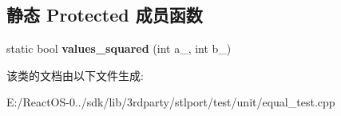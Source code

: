 \subsection*{静态 Protected 成员函数}
\begin{DoxyCompactItemize}
\item 
\mbox{\label{class_equal_test_a5cbc4fa89d5a732d8feca3b4582776fc}} 
static bool {\bfseries values\+\_\+squared} (int a\+\_\+, int b\+\_\+)
\end{DoxyCompactItemize}


该类的文档由以下文件生成\+:\begin{DoxyCompactItemize}
\item 
E\+:/\+React\+O\+S-\/0../sdk/lib/3rdparty/stlport/test/unit/equal\+\_\+test.\+cpp\end{DoxyCompactItemize}

